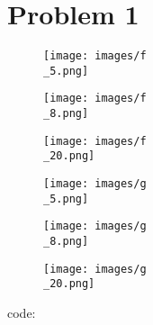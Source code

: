 \documentclass{article}
\title{\thetitle}
\author{\theauthor}
\begin{document}
\maketitle
\section*{Problem 1}
\begin{figure}[htbp]
  \centering
  \texttt{[image: images/f\\\_5.png]}
\end{figure}

\begin{figure}[htbp]
  \centering
  \texttt{[image: images/f\\\_8.png]}
\end{figure}
\begin{figure}[htbp]
  \centering
  \texttt{[image: images/f\\\_20.png]}
\end{figure}
\begin{figure}[htbp]
  \centering
  \texttt{[image: images/g\\\_5.png]}
\end{figure}
\begin{figure}[htbp]
  \centering
  \texttt{[image: images/g\\\_8.png]}
\end{figure}
\begin{figure}[htbp]
  \centering
  \texttt{[image: images/g\\\_20.png]}
\end{figure}
\newpage
code:\\
\end{document}
